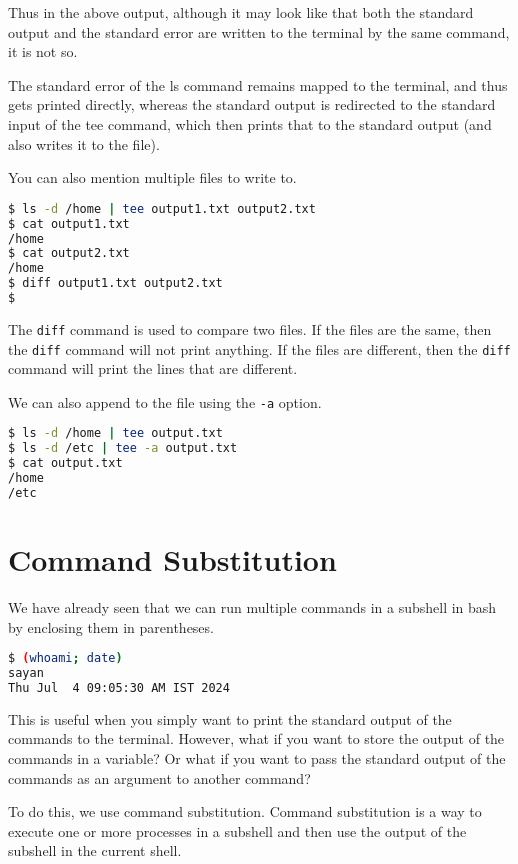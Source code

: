 Thus in the above output, although it may look like that both
the standard output and the standard error are written to the
terminal by the same command, it is not so.

The standard error of the ls command remains mapped to the terminal,
and thus gets printed directly, whereas the standard output is
redirected to the standard input of the tee command, which then
prints that to the standard output (and also writes it to the file).

You can also mention multiple files to write to.

\begin{lstlisting}[language=bash]
$ ls -d /home | tee output1.txt output2.txt
$ cat output1.txt
/home
$ cat output2.txt
/home
$ diff output1.txt output2.txt
$
\end{lstlisting}

\begin{remark}
  The \texttt{diff} command is used to compare two files. If the
  files are the same, then the \texttt{diff} command will not print
  anything. If the files are different, then the \texttt{diff} command
  will print the lines that are different.
\end{remark}

We can also append to the file using the \texttt{-a} option.

\begin{lstlisting}[language=bash]
$ ls -d /home | tee output.txt
$ ls -d /etc | tee -a output.txt
$ cat output.txt
/home
/etc
\end{lstlisting}

\section{Command Substitution}

We have already seen that we can run multiple commands in a subshell
in bash by enclosing them in parentheses.

\begin{lstlisting}[language=bash]
$ (whoami; date)
sayan
Thu Jul  4 09:05:30 AM IST 2024
\end{lstlisting}

This is useful when you simply want to print the standard output of the
commands to the terminal. However, what if you want to store the output
of the commands in a variable? Or what if you want to pass the standard
output of the commands as an argument to another command?

To do this, we use command substitution. Command substitution is a way
to execute one or more processes in a subshell and then use the output
of the subshell in the current shell.


